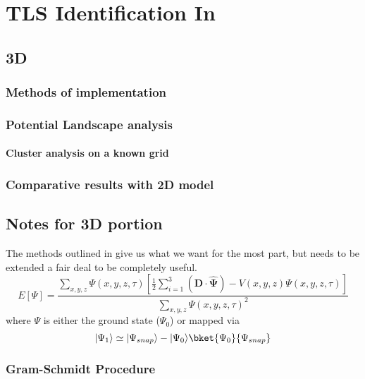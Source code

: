 \versoimage
\chapter{TLS Identification In }\label{ch:threedee}


\section{3D}
\subsection{Methods of implementation}
\subsection{Potential Landscape analysis}
\subsubsection{Cluster analysis on a known grid}
\subsection{Comparative results with 2D model}

\section{Notes for 3D portion}
The methods outlined in \cite{Strickland2010} give us what we want for the most part, but needs to be extended a fair deal to be completely useful.
\begin{equation}
E[\Psi] = \frac{\sum_{x,y,z}\Psi(x,y,z,\tau)\left[\frac{1}{2}\sum_{i=1}^3\left(\mathbf{D\cdot\widehat{\Psi}}\right)-V(x,y,z)\Psi(x,y,z,\tau)\right]}{\sum_{x,y,z}\Psi(x,y,z,\tau)^2}
\end{equation}
where $\Psi$ is either the ground state ($\Psi_0$) or mapped via
\begin{equation}
 \ket{\Psi_1} \simeq \ket{\Psi_{snap}} - \ket{\Psi_0}\bket{\Psi_0}{\Psi_{snap}}
\end{equation}

\subsection{Gram-Schmidt Procedure}\label{subsec:gsp}

